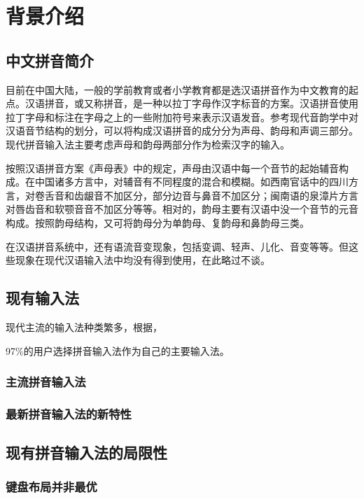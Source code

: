 \chapter{背景介绍}
  \section{中文拼音简介}

  目前在中国大陆，一般的学前教育或者小学教育都是选汉语拼音作为中文教育的起点。汉语拼音，或又称拼音，是一种以拉丁字母作汉字标音的方案。\supercite{wjm}汉语拼音使用拉丁字母和标注在字母之上的一些附加符号来表示汉语发音。参考现代音韵学中对汉语音节结构的划分，可以将构成汉语拼音的成分分为声母、韵母和声调三部分。现代拼音输入法主要考虑声母和韵母两部分作为检索汉字的输入。

  按照汉语拼音方案《声母表》中的规定，声母由汉语中每一个音节的起始辅音构成。在中国诸多方言中，对辅音有不同程度的混合和模糊。如西南官话中的四川方言，对卷舌音和齿龈音不加区分，部分边音与鼻音不加区分；闽南语的泉漳片方言对唇齿音和软颚音音不加区分等等。\supercite{jdp}相对的，韵母主要有汉语中没一个音节的元音构成。按照韵母结构，又可将韵母分为单韵母、复韵母和鼻韵母三类。

  在汉语拼音系统中，还有语流音变现象，包括变调、轻声、儿化、音变等等。但这些现象在现代汉语输入法中均没有得到使用，在此略过不谈。

  \section{现有输入法\label{sec:current_input}}
  现代主流的输入法种类繁多，根据，

  97\%的用户选择拼音输入法作为自己的主要输入法。\supercite{chen}

  \subsection{主流拼音输入法}

  \subsection{最新拼音输入法的新特性\label{sec:new_feature}}

  \section{现有拼音输入法的局限性\label{sec:limit}}

  \subsection{键盘布局并非最优\label{sec:layout_defect}}

